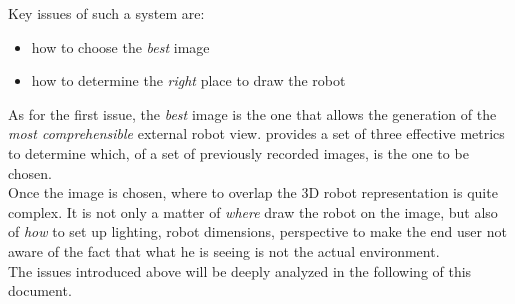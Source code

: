 Key issues of such a system are:

\begin{itemize}
\item how to choose the \textit{best} image
\item how to determine the \textit{right} place to draw the robot
\end{itemize}

As for the first issue, the \textit{best} image is the one that allows 
the generation of the \textit{most comprehensible} external robot view.
\cite{sugimoto} provides a set of three effective metrics to 
determine which, of a set of previously recorded images, is the 
one to be chosen.
\\
Once the image is chosen, where to overlap the 3D robot representation 
is quite complex. It is not only a matter of \textit{where} draw the robot
on the image, but also of \textit{how} to set up lighting, robot dimensions,
perspective to make the end user not aware of the fact that what he is
seeing is not the actual environment.
\\
The issues introduced above will be deeply analyzed in the following 
of this document.
